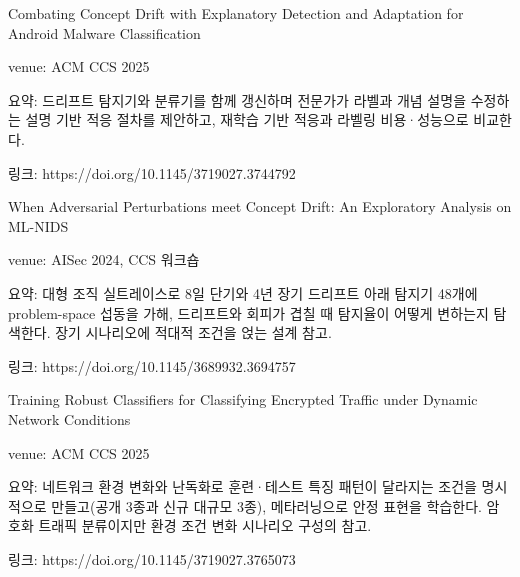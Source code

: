 \par\noindent \textbullet\enspace Combating Concept Drift with Explanatory Detection and Adaptation for Android Malware Classification


\par\noindent \textbullet\enspace venue: ACM CCS 2025


\par\noindent \textbullet\enspace 요약: 드리프트 탐지기와 분류기를 함께 갱신하며 전문가가 라벨과 개념 설명을 수정하는 설명 기반 적응 절차를 제안하고, 재학습 기반 적응과 라벨링 비용·성능으로 비교한다.


\par\noindent \textbullet\enspace 링크: https:/\allowbreak{}/\allowbreak{}doi.org/\allowbreak{}10.1145/\allowbreak{}3719027.3744792


\par\noindent \textbullet\enspace When Adversarial Perturbations meet Concept Drift: An Exploratory Analysis on ML-NIDS


\par\noindent \textbullet\enspace venue: AISec 2024, CCS 워크숍


\par\noindent \textbullet\enspace 요약: 대형 조직 실트레이스로 8일 단기와 4년 장기 드리프트 아래 탐지기 48개에 problem-space 섭동을 가해, 드리프트와 회피가 겹칠 때 탐지율이 어떻게 변하는지 탐색한다. 장기 시나리오에 적대적 조건을 얹는 설계 참고.


\par\noindent \textbullet\enspace 링크: https:/\allowbreak{}/\allowbreak{}doi.org/\allowbreak{}10.1145/\allowbreak{}3689932.3694757


\par\noindent \textbullet\enspace Training Robust Classifiers for Classifying Encrypted Traffic under Dynamic Network Conditions


\par\noindent \textbullet\enspace venue: ACM CCS 2025


\par\noindent \textbullet\enspace 요약: 네트워크 환경 변화와 난독화로 훈련·테스트 특징 패턴이 달라지는 조건을 명시적으로 만들고(공개 3종과 신규 대규모 3종), 메타러닝으로 안정 표현을 학습한다. 암호화 트래픽 분류이지만 환경 조건 변화 시나리오 구성의 참고.


\par\noindent \textbullet\enspace 링크: https:/\allowbreak{}/\allowbreak{}doi.org/\allowbreak{}10.1145/\allowbreak{}3719027.3765073


